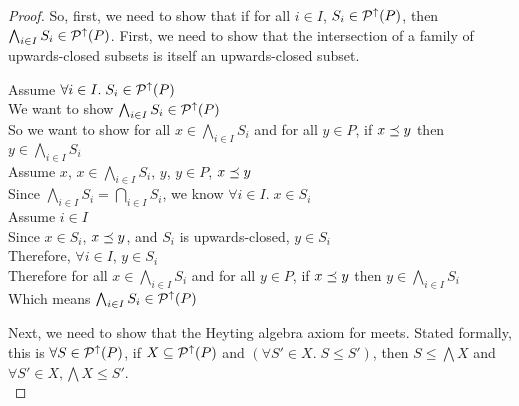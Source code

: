 \begin{proof}
So, first, we need to show that if for all $i \in I$, $S_i \in \mathcal{P}^{\uparrow}({P})$, 
then $\bigwedge_{i \in I} S_i \in \mathcal{P}^{\uparrow}({P})$. First, we need to show that 
the intersection of a family of upwards-closed subsets is itself an
upwards-closed subset. 

\begin{tabbedproof}
\oo Assume $\forall i \in I.\; S_i \in \mathcal{P}^{\uparrow}({P})$ \\
\ooo We want to show $\bigwedge_{i \in I} S_i \in \mathcal{P}^{\uparrow}({P})$ \\ 
\ooo So we want to show for all $x \in \bigwedge_{i \in I} S_i$ and for all $y \in P$, if $x \preceq y$ then $y \in \bigwedge_{i \in I} S_i$ \\
\ooo Assume $x$, $x \in \bigwedge_{i \in I} S_i$, $y$, $y \in P$, $x \preceq y$ \\
\oooo Since $\bigwedge_{i \in I} S_i = \bigcap_{i \in I} S_i$, we know 
      $\forall i \in I.\; x \in S_i$ \\
\oooo Assume $i \in I$ \\
\ooooo Since $x \in S_i$, $x \preceq y$, and $S_i$ is upwards-closed, $y \in S_i$ \\
\oooo Therefore, $\forall i \in I$, $y \in S_i$ \\
\ooo Therefore for all $x \in \bigwedge_{i \in I} S_i$ and for all $y \in P$, if $x \preceq y$ then $y \in \bigwedge_{i \in I} S_i$ \\
\ooo Which means $\bigwedge_{i \in I} S_i \in \mathcal{P}^{\uparrow}({P})$ \\ 
\end{tabbedproof}

\noindent Next, we need to show that the Heyting algebra axiom for meets. 
Stated formally,
this is $\forall S \in \mathcal{P}^{\uparrow}({P})$, if $X \subseteq
\mathcal{P}^{\uparrow}({P})$ and $(\forall S' \in X.\; S \leq S')$, then $S
\leq \bigwedge X$ and $\forall S' \in X, \bigwedge X \leq S'$.
\\


\end{proof}
